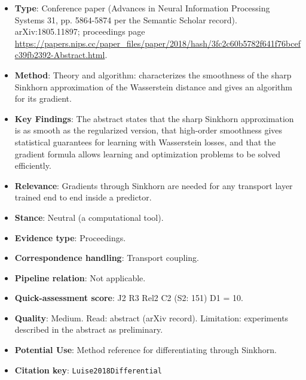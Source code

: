 \documentclass[journal,onecolumn]{IEEEtran}
\begin{document}
\begin{itemize}

\item{} \textbf{Type}: Conference paper (Advances in Neural Information Processing Systems 31, pp. 5864-5874 per the Semantic Scholar record). arXiv:1805.11897; proceedings page \url{https://papers.nips.cc/paper_files/paper/2018/hash/3fc2c60b5782f641f76bcefc39fb2392-Abstract.html}.

\item{} \textbf{Method}: Theory and algorithm: characterizes the smoothness of the sharp Sinkhorn approximation of the Wasserstein distance and gives an algorithm for its gradient.

\item{} \textbf{Key Findings}: The abstract states that the sharp Sinkhorn approximation is as smooth as the regularized version, that high-order smoothness gives statistical guarantees for learning with Wasserstein losses, and that the gradient formula allows learning and optimization problems to be solved efficiently.

\item{} \textbf{Relevance}: Gradients through Sinkhorn are needed for any transport layer trained end to end inside a predictor.

\item{} \textbf{Stance}: Neutral (a computational tool).

\item{} \textbf{Evidence type}: Proceedings.

\item{} \textbf{Correspondence handling}: Transport coupling.

\item{} \textbf{Pipeline relation}: Not applicable.

\item{} \textbf{Quick-assessment score}: J2 R3 Rel2 C2 (S2: 151) D1 = 10.

\item{} \textbf{Quality}: Medium. Read: abstract (arXiv record). Limitation: experiments described in the abstract as preliminary.

\item{} \textbf{Potential Use}: Method reference for differentiating through Sinkhorn.

\item{} \textbf{Citation key}: \texttt{Luise2018Differential}

\end{itemize}
\end{document}
